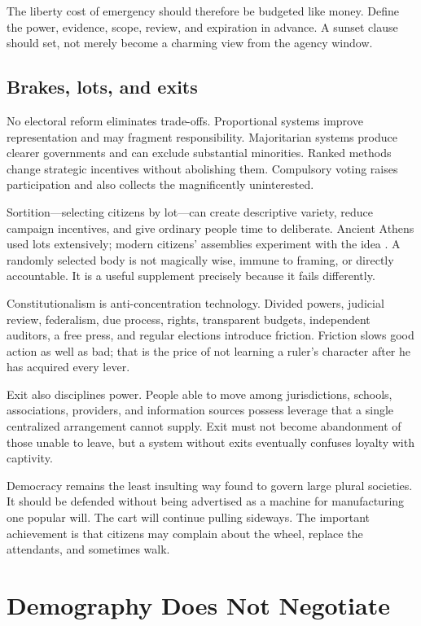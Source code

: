 \documentclass[12pt,a4paper]{book}
\begin{document}
The liberty cost of emergency should therefore be budgeted like money.  Define
the power, evidence, scope, review, and expiration in advance.  A sunset clause
should set, not merely become a charming view from the agency window.

\section{Brakes, lots, and exits}

No electoral reform eliminates trade-offs.  Proportional systems improve
representation and may fragment responsibility.  Majoritarian systems produce
clearer governments and can exclude substantial minorities.  Ranked methods
change strategic incentives without abolishing them.  Compulsory voting raises
participation and also collects the magnificently uninterested.

Sortition---selecting citizens by lot---can create descriptive variety, reduce
campaign incentives, and give ordinary people time to deliberate.  Ancient
Athens used lots extensively; modern citizens' assemblies experiment with the
idea \cite{dow_aristotlekleroteria_1939,Sintomer2016}.  A randomly selected
body is not magically wise, immune to framing, or directly accountable.  It is
a useful supplement precisely because it fails differently.

Constitutionalism is anti-concentration technology.  Divided powers, judicial
review, federalism, due process, rights, transparent budgets, independent
auditors, a free press, and regular elections introduce friction.  Friction
slows good action as well as bad; that is the price of not learning a ruler's
character after he has acquired every lever.

Exit also disciplines power.  People able to move among jurisdictions,
schools, associations, providers, and information sources possess leverage
that a single centralized arrangement cannot supply.  Exit must not become
abandonment of those unable to leave, but a system without exits eventually
confuses loyalty with captivity.

Democracy remains the least insulting way found to govern large plural
societies.  It should be defended without being advertised as a machine for
manufacturing one popular will.  The cart will continue pulling sideways.  The
important achievement is that citizens may complain about the wheel, replace
the attendants, and sometimes walk.

\chapter{Demography Does Not Negotiate}
\label{chap:demography-negotiates}
\end{document}
